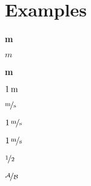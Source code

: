 \documentclass{article}
\begin{document}
\section{Examples}
\sffamily\bfseries\unit{m}

\sffamily\bfseries$\unit{m}$

\sffamily\bfseries\unit[1]{m}

\sffamily\bfseries$\unit[1]{m}$

\sffamily\bfseries{}

\sffamily\bfseries$\unitfrac{m}{s}$

\sffamily\bfseries{}

\sffamily\bfseries$\unitfrac[1]{m}{s}$


\scriptsize\sffamily\itshape{}

\scriptsize\sffamily\itshape$\unitfrac[1]{m}{s}$


\bfseries\itshape{}

\bfseries\itshape$\nicefrac{1}{2}$


$\nicefrac[\mathcal]{A}{B}$
\end{document}
